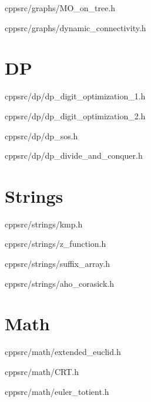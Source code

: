 \documentclass[portrait, 8pt, a4paper, oneside, twocolumn]{extarticle}
\begin{document}
	{}
	{}
	{cpp}{src/graphs/MO_on_tree.h}
	\noindent\hrulefill


	{}
	{}
	{cpp}{src/graphs/dynamic_connectivity.h}
	\noindent\hrulefill

\section{DP}
    {}
    {}
    {cpp}{src/dp/dp_digit_optimization_1.h}
    \noindent\hrulefill

    {}
    {}
    {cpp}{src/dp/dp_digit_optimization_2.h}
    \noindent\hrulefill

    {}
    {}
    {cpp}{src/dp/dp_sos.h}
    \noindent\hrulefill

    {}
    {}
    {cpp}{src/dp/dp_divide_and_conquer.h}
    \noindent\hrulefill

\section{Strings}
    {}
    {}
    {cpp}{src/strings/kmp.h}
    \noindent\hrulefill

    {}
    {}
    {cpp}{src/strings/z_function.h}
    \noindent\hrulefill
 
    {}
    {}
    {cpp}{src/strings/suffix_array.h}
    \noindent\hrulefill

    {}
    {}
    {cpp}{src/strings/aho_corasick.h}
    \noindent\hrulefill

\section{Math}
    {}
    {}
    {cpp}{src/math/extended_euclid.h}
    \noindent\hrulefill

    {}
    {}
    {cpp}{src/math/CRT.h}
    \noindent\hrulefill


    {}
    {}
    {cpp}{src/math/euler_totient.h}
    \noindent\hrulefill
\end{document}
